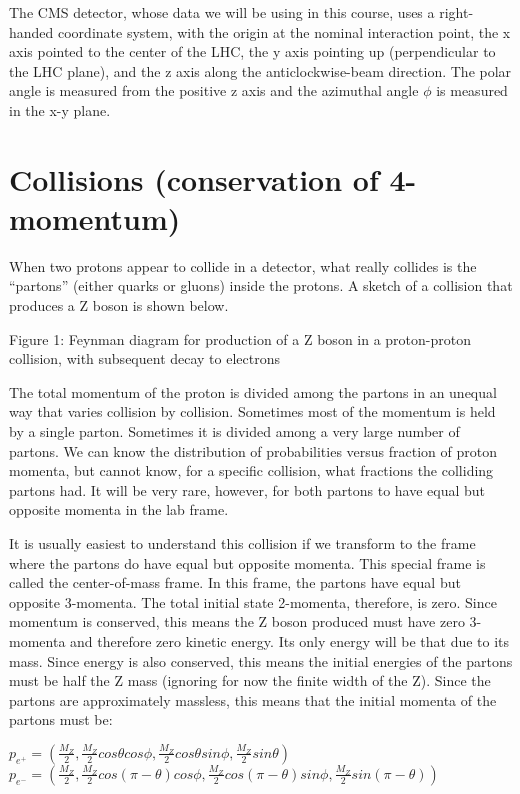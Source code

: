 The CMS detector, whose data we will be using in this course, uses a right-handed coordinate system, with the origin at the nominal interaction point, the x axis pointed to the center of the LHC, the y axis pointing up (perpendicular to the LHC plane), and the z axis along the anticlockwise-beam direction.  The polar angle   is measured from the positive z axis and the azimuthal angle  $\phi$  is measured in the x-y plane.

\section{Collisions (conservation of 4-momentum)}

When two protons appear to collide in a detector, what really collides is the “partons” (either quarks or gluons) inside the protons.  A sketch of a collision that produces a Z boson is shown below.
 


Figure 1: Feynman diagram for production of a Z boson in a proton-proton collision, with subsequent decay to electrons


The total momentum of the proton is divided among the partons in an unequal way that varies collision by collision.  Sometimes most of the momentum is held by a single parton.  Sometimes it is divided among a very large number of partons.  We can know the distribution of probabilities versus fraction of proton momenta, but cannot know, for a specific collision, what fractions the colliding partons had.  It will be very rare, however, for both partons to have equal but opposite momenta in the lab frame.

It is usually easiest to understand this collision if we transform to the frame where the partons do have equal but opposite momenta.  This special frame is called the center-of-mass frame.  In this frame, the partons have equal but opposite 3-momenta.  The total initial state 2-momenta, therefore, is zero.  Since momentum is conserved, this means the Z boson produced must have zero 3-momenta and therefore zero kinetic energy.  Its only energy will be that due to its mass.  Since energy is also conserved, this means the initial energies of the partons must be half the Z mass (ignoring for now the finite width of the Z).  Since the partons are approximately massless, this means that the initial momenta of the partons must be:

$ p_{e^+} = (\frac{M_Z}{2}, \frac{M_Z}{2} cos \theta cos \phi ,  \frac{M_Z}{2} cos \theta sin \phi , \frac{M_Z}{2} sin \theta)$ 
$ p_{e^-} = (\frac{M_Z}{2}, \frac{M_Z}{2} cos (\pi - \theta) cos \phi ,  \frac{M_Z}{2} cos  (\pi - \theta) sin \phi , \frac{M_Z}{2} sin  (\pi - \theta))$ 

